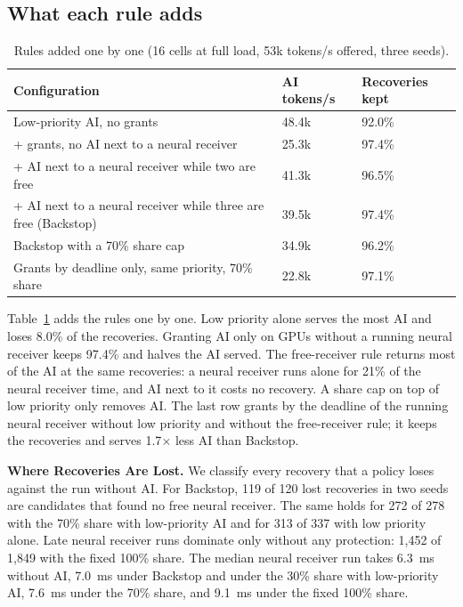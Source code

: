 \documentclass[acmsmall,screen,review,anonymous]{acmart}
\newcommand{\sys}{Backstop\xspace}
\begin{document}
\subsection{What each rule adds}

\begin{table}[t]
\caption{Rules added one by one (16 cells at full load, 53k tokens/s offered, three seeds).}
\label{tab:rules}
\footnotesize
\begin{tabular}{@{}lll@{}}
\toprule
Configuration & AI tokens/s & Recoveries kept \\
\midrule
Low-priority AI, no grants & 48.4k & 92.0\% \\
+ grants, no AI next to a neural receiver & 25.3k & 97.4\% \\
+ AI next to a neural receiver while two are free & 41.3k & 96.5\% \\
+ AI next to a neural receiver while three are free (\sys) & 39.5k & 97.4\% \\
\sys with a 70\% share cap & 34.9k & 96.2\% \\
Grants by deadline only, same priority, 70\% share & 22.8k & 97.1\% \\
\bottomrule
\end{tabular}
\end{table}

Table~\ref{tab:rules} adds the rules one by one. Low priority alone serves the most AI and loses 8.0\% of
the recoveries. Granting AI only on GPUs without a running neural receiver keeps 97.4\% and halves the AI
served. The free-receiver rule returns most of the AI at the same recoveries: a neural receiver runs alone
for 21\% of the neural receiver time, and AI next to it costs no recovery. A share cap on top of low
priority only removes AI. The last row grants by the deadline of the running neural receiver without low
priority and without the free-receiver rule; it keeps the recoveries and serves 1.7$\times$ less AI than
\sys.

\noindent\textbf{Where Recoveries Are Lost.} We classify every recovery that a policy loses against the run
without AI. For \sys, 119 of 120 lost recoveries in two seeds are candidates that found no free neural
receiver. The same holds for 272 of 278 with the 70\% share with low-priority AI and for 313 of 337 with
low priority alone. Late neural receiver runs dominate only without any protection: 1,452 of 1,849 with the
fixed 100\% share. The median neural receiver run takes 6.3~ms without AI, 7.0~ms under \sys and under the
30\% share with low-priority AI, 7.6~ms under the 70\% share, and 9.1~ms under the fixed 100\% share.
\end{document}
